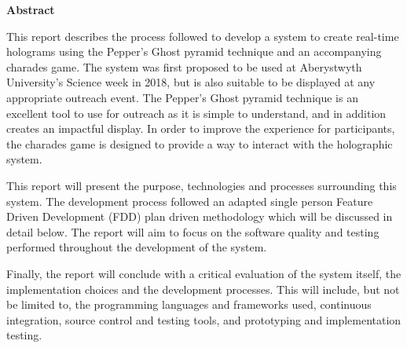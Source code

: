 \thispagestyle{empty}

\begin{center}
    {\LARGE\bf Abstract}
\end{center}

This report describes the process followed to develop a system to create real-time holograms using the Pepper's Ghost pyramid technique and an accompanying charades game. The system was first proposed to be used at Aberystwyth University's Science week in 2018, but is also suitable to be displayed at any appropriate outreach event. The Pepper's Ghost pyramid technique is an excellent tool to use for outreach as it is simple to understand, and in addition creates an impactful display. In order to improve the experience for participants, the charades game is designed to provide a way to interact with the holographic system.

This report will present the purpose, technologies and processes surrounding this system. The development process followed an adapted single person Feature Driven Development (FDD) plan driven methodology which will be discussed in detail below. The report will aim to focus on the software quality and testing performed throughout the development of the system.

Finally, the report will conclude with a critical evaluation of the system itself, the implementation choices and the development processes. This will include, but not be limited to, the programming languages and frameworks used, continuous integration, source control and testing tools, and prototyping and implementation testing.

